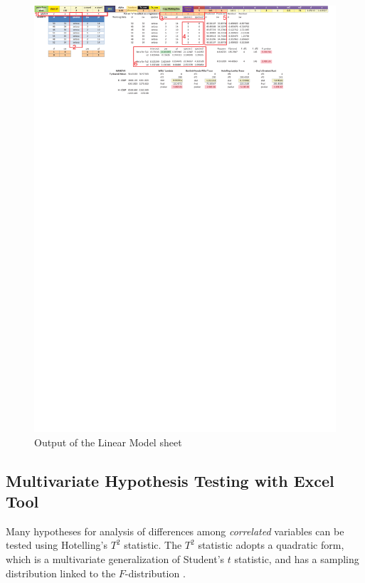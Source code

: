 \documentclass[article]{jss}
\begin{document}
        \begin{figure}[!tbh]
                \centering
                \includegraphics[width=\linewidth, keepaspectratio=true]{img/LMSheetOutput_markup}
                \centering{}\protect\caption{Output of the Linear Model sheet}\label{fig:LMSheetOutput_markup}
        \end{figure}
        
        \subsection[egOneSample]{Multivariate Hypothesis Testing with Excel Tool}
        
        
        Many hypotheses for analysis of differences among \emph{correlated} variables can be tested using Hotelling's $T^2$ statistic. The $T^2$ statistic adopts a quadratic form, which is a multivariate generalization of Student's $t$ statistic, and has a sampling distribution linked to the $F$-distribution \citep{hotelling1931Tsq}. 
        
\end{document}
